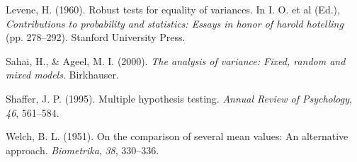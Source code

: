 \documentclass[
  a4paper,
]{book}
\newlength{\cslhangindent}
\newlength{\cslentryspacingunit} %
\newenvironment{CSLReferences}[2] %
 {%
  \setlength{\parindent}{0pt}
  \ifodd #1
  \let\oldpar\par
  \def\par{\hangindent=\cslhangindent\oldpar}
  \fi
  \setlength{\parskip}{#2\cslentryspacingunit}
 }%
 {}
\begin{document}
\begin{CSLReferences}{1}{0}
\leavevmode{}%
Levene, H. (1960). Robust tests for equality of variances. In I. O. et
al (Ed.), \emph{Contributions to probability and statistics: Essays in
honor of harold hotelling} (pp. 278--292). Stanford University Press.

\leavevmode{}%
Sahai, H., \& Ageel, M. I. (2000). \emph{The analysis of variance:
Fixed, random and mixed models}. Birkhauser.

\leavevmode{}%
Shaffer, J. P. (1995). Multiple hypothesis testing. \emph{Annual Review
of Psychology}, \emph{46}, 561--584.

\leavevmode{}%
Welch, B. L. (1951). On the comparison of several mean values: An
alternative approach. \emph{Biometrika}, \emph{38}, 330--336.

\end{CSLReferences}


\backmatter

\printendnotes
\newpage
\printindex

\end{document}
